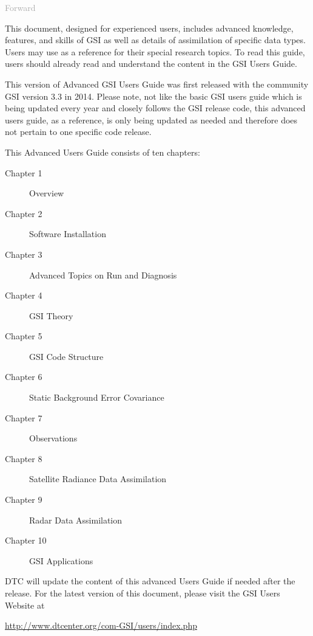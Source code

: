 \begin{titlepage}
\vspace*{0.5cm}
\noindent

\begin{flushleft}
\textcolor{darkgray}{\LARGE Forward}
\vspace*{1cm}\par

This document, designed for experienced users, includes advanced knowledge, features, and skills of GSI as well as details of assimilation of specific data types. Users may use as a reference for their special research topics. To read this guide, users should already read and understand the content in the GSI User\textquotesingle s Guide. 

This version of Advanced GSI User\textquotesingle s Guide was first released with the community GSI version 3.3 in 2014. Please note, not like the basic GSI user\textquotesingle s guide which is being updated every year and closely follows the GSI release code, this advanced user\textquotesingle s guide, as a reference, is only being updated as needed and therefore does not pertain to one specific code release. 

This Advanced User\textquotesingle s Guide consists of ten chapters:
\begin{description}
\item[Chapter 1] Overview
\item[Chapter 2] Software Installation
\item[Chapter 3] Advanced Topics on Run and Diagnosis 
\item[Chapter 4] GSI Theory 
\item[Chapter 5] GSI Code Structure 
\item[Chapter 6] Static Background Error Covariance 
\item[Chapter 7] Observations 
\item[Chapter 8] Satellite Radiance Data Assimilation 
\item[Chapter 9] Radar Data Assimilation 
\item[Chapter 10] GSI Applications
\end{description}

DTC will update the content of this advanced User\textquotesingle s Guide if needed after the release. For the latest version of this document, please visit the GSI User\textquotesingle s Website at

\url{http://www.dtcenter.org/com-GSI/users/index.php}


\end{flushleft}
\end{titlepage}
